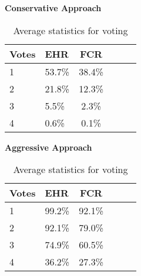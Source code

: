 \begin{table}[h]
  \centering
  \textbf{Conservative Approach}\vspace{2pt}
  \begin{tabularx}{\columnwidth}{XXcXXc}
    \toprule
    \textbf{Votes} & \textbf{EHR} & \textbf{FCR} \\
    \midrule
    1              & 53.7\%       & 38.4\%       \\ \hline
    2              & 21.8\%       & 12.3\%       \\ \hline
    3              & 5.5\%        & 2.3\%        \\ \hline
    4              & 0.6\%        & 0.1\%        \\ \hline
    \bottomrule
  \end{tabularx}

  \vspace{4pt}

  \textbf{Aggressive Approach}\vspace{2pt}
  \begin{tabularx}{\columnwidth}{XXcXXc}
    \toprule
    \textbf{Votes} & \textbf{EHR} & \textbf{FCR} \\
    \midrule
    1              & 99.2\%       & 92.1\%       \\ \hline
    2              & 92.1\%       & 79.0\%       \\ \hline
    3              & 74.9\%       & 60.5\%       \\ \hline
    4              & 36.2\%       & 27.3\%       \\ \hline
    \bottomrule
  \end{tabularx}

  \caption{Average statistics for voting}
  \label{[TABLE] avg_stats_voting}
\end{table}